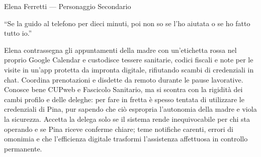 \begin{personacard}{Elena Ferretti --- Personaggio Secondario}
\begin{minipage}[t]{0.72\linewidth}
\end{minipage}

\begin{personaquote}
``Se la guido al telefono per dieci minuti, poi non so se l'ho aiutata o se ho fatto tutto io.''
\end{personaquote}


Elena contrassegna gli appuntamenti della madre con un'etichetta rossa nel proprio Google Calendar e custodisce tessere sanitarie, codici fiscali e note per le visite in un'app protetta da impronta digitale, rifiutando scambi di credenziali in chat. Coordina prenotazioni e disdette da remoto durante le pause lavorative. Conosce bene CUPweb e Fascicolo Sanitario, ma si scontra con la rigidità dei cambi profilo e delle deleghe: per fare in fretta è spesso tentata di utilizzare le credenziali di Pina, pur sapendo che ciò espropria l'autonomia della madre e viola la sicurezza. Accetta la delega solo se il sistema rende inequivocabile per chi sta operando e se Pina riceve conferme chiare; teme notifiche carenti, errori di omonimia e che l'efficienza digitale trasformi l'assistenza affettuosa in controllo permanente.



\end{personacard}
